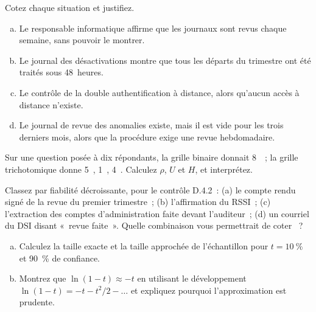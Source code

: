 \bigskip

\begin{boxexo}[title={\ding{45}\quad Exercice~10.1. OUI, NON, NEK ou non applicable~? \niveaubase}]
Cotez chaque situation et justifiez.
\begin{enumerate}[(a)]
    \item Le responsable informatique affirme que les journaux sont revus
          chaque semaine, sans pouvoir le montrer.
    \item Le journal des désactivations montre que tous les départs du
          trimestre ont été traités sous 48~heures.
    \item Le contrôle de la double authentification à distance, alors
          qu'aucun accès à distance n'existe.
    \item Le journal de revue des anomalies existe, mais il est vide pour
          les trois derniers mois, alors que la procédure exige une revue
          hebdomadaire.
\end{enumerate}
\end{boxexo}

\begin{boxexo}[title={\ding{45}\quad Exercice~10.2. Le biais \niveaubase}]
Sur une question posée à dix répondants, la grille binaire donnait
8~\OUI{}~; la grille trichotomique donne 5~\OUI{}, 1~\NON{}, 4~\NEK{}.
Calculez $\rho$, $U$ et $H$, et interprétez.
\end{boxexo}

\begin{boxexo}[title={\ding{45}\quad Exercice~10.3. Classer des preuves \niveaubase}]
Classez par fiabilité décroissante, pour le contrôle D.4.2~: (a) le
compte rendu signé de la revue du premier trimestre~; (b) l'affirmation du
RSSI~; (c) l'extraction des comptes d'administration faite devant
l'auditeur~; (d) un courriel du DSI disant «~revue faite~». Quelle
combinaison vous permettrait de coter \OUI{}~?
\end{boxexo}

\begin{boxexo}[title={\ding{45}\quad Exercice~10.4. Démontrer \niveaumoyen}]
\begin{enumerate}[(a)]
    \item Calculez la taille exacte et la taille approchée de l'échantillon
          pour $t = 10~\%$ et 90~\% de confiance.
    \item Montrez que $\ln(1-t) \approx -t$ en utilisant le développement
          $\ln(1-t) = -t - t^2/2 - \dots$ et expliquez pourquoi
          l'approximation est prudente.
\end{enumerate}
\end{boxexo}

